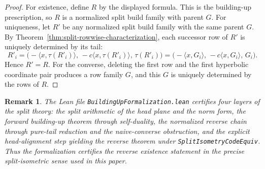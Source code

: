 \documentclass[12pt]{article}
\newtheorem{remark}[theorem]{Remark}
\begin{document}
\begin{proof}
For existence, define $R$ by the displayed formula. This is the building-up prescription, so $R$ is a normalized split build family with parent $G$. For uniqueness, let $R'$ be any normalized split build family with the same parent $G$. By Theorem~\ref{thm:split-rowwise-characterization}, each successor row of $R'$ is uniquely determined by its tail:
\[
R'_i
=
\bigl(-\langle x,\tau(R'_i)\rangle,\,-c\langle x,\tau(R'_i)\rangle,\,\tau(R'_i)\bigr)
=
\bigl(-\langle x,G_i\rangle,\,-c\langle x,G_i\rangle,\,G_i\bigr).
\]
Hence $R'=R$. For the converse, deleting the first row and the first hyperbolic coordinate pair produces a row family $G$, and this $G$ is uniquely determined by the rows of $R$.
\end{proof}

\begin{remark}
\rm
The Lean file \texttt{BuildingUpFormalization.lean} certifies four layers of the split theory: the split arithmetic of the head plane and the norm form, the forward building-up theorem through self-duality, the normalized reverse chain through pure-tail reduction and the naive-converse obstruction, and the explicit head-alignment step yielding the reverse theorem under \texttt{SplitIsometryCodeEquiv}. Thus the formalization certifies the reverse existence statement in the precise split-isometric sense used in this paper.
\end{remark}
\end{document}
